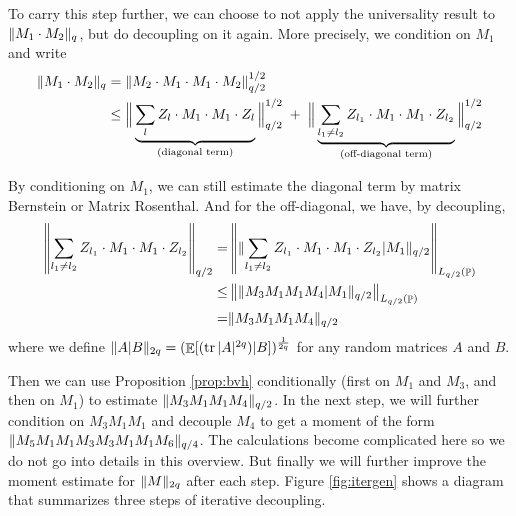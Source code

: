 \documentclass[11pt]{amsart}
\numberwithin{equation}{section}
\numberwithin{equation}{section}
\DeclareMathOperator{\E}{\mathbb{E}}
\DeclareMathOperator{\Pb}{\mathbb{P}}
\DeclareMathOperator*{\tr}{tr}
\DeclarePairedDelimiter{\norm}{\lVert}{\rVert}
\newcommand{\norml}[1]{\left\lVert#1\right\rVert}
\begin{document}
To carry this step further, we can choose to not apply the universality result to $\norm{M_1 \cdot M_2}_q$, but do decoupling on it again. More precisely, we condition on $M_1$ and write
\begin{align*}
    \norm{M_1 \cdot M_2}_q&=\norm{M_2 \cdot M_1 \cdot M_1 \cdot M_2}_{q/2}^{1/2}
    \\&\le    
    {\Big\lVert \underbrace{\sum_{l} Z_l\cdot M_1 \cdot M_1 \cdot Z_l}_{(\text{diagonal term})} \Big\rVert_{q/2}^{1/2}}
\;+\;
    {\Big\lVert \underbrace{\sum_{l_1 \neq l_2} Z_{l_1} \cdot M_1 \cdot M_1 \cdot Z_{l_2}}_{(\text{off-diagonal term})} \Big\rVert_{q/2}^{1/2}}
\end{align*}

By conditioning on $M_1$, we can still estimate the diagonal term by matrix Bernstein or Matrix Rosenthal. And for the off-diagonal, we have, by decoupling,
\begin{align*}
    \left\lVert \sum_{l_1 \neq l_2} Z_{l_1} \cdot M_1 \cdot M_1 \cdot Z_{l_2} \right\rVert_{q/2}=&\norml{\norm{\sum_{l_1 \neq l_2} Z_{l_1} \cdot M_1 \cdot M_1 \cdot Z_{l_2}|M_1}_{q/2}}_{L_{q/2}(\Pb)}
    \\ \le & \norml{\norm{M_3 M_1 M_1 M_4|M_1}_{q/2}}_{L_{q/2}(\Pb)}
    \\ = & \norm{M_3 M_1 M_1 M_4}_{q/2}
\end{align*}
where we define $\norm{A|B}_{2q}=(\E[(\tr|A|^{2q})|B])^{\frac{1}{2q}}$ for any random matrices $A$ and $B$.

Then we can use Proposition \ref{prop:bvh} conditionally (first on $M_1$ and $M_3$, and then on $M_1$) to estimate $\norm{M_3 M_1 M_1 M_4}_{q/2}$. In the next step, we will further condition on $M_3M_1M_1$ and decouple $M_4$ to get a moment of the form  $\norm{M_5M_1M_1M_3M_3 M_1 M_1 M_6}_{q/4}$. The calculations become complicated here so we do not go into details in this overview. But finally we will further improve the moment estimate for $\norm{M}_{2q}$ after each step. Figure \ref{fig:itergen} shows a diagram that summarizes three steps of iterative decoupling.
\end{document}
